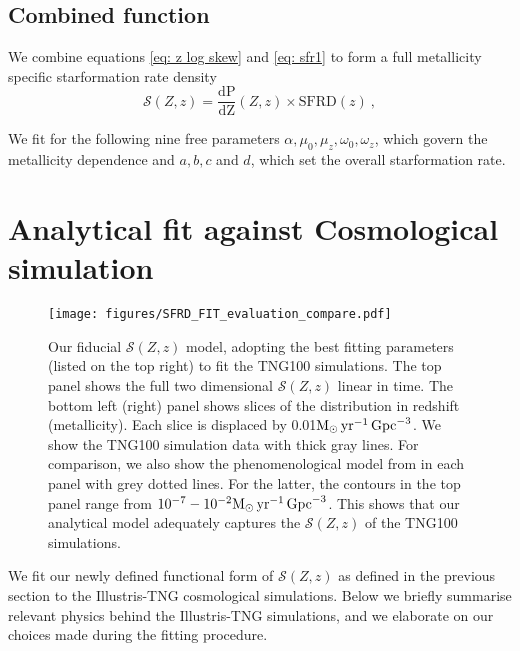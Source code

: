 \documentclass[twocolumn]{aastex631}
\newcommand{\Msun}{\ensuremath{\rm{M}_{\odot}}\xspace}
\newcommand{\yr}{\ensuremath{\,\rm{yr}}\xspace}
\newcommand{\Mpc}{\ensuremath{\,\rm{Gpc}}\xspace}
\newcommand{\SFRDzZ}{\ensuremath{\mathcal{S}(Z,z)}\xspace}
\newcommand{\SFRDz}{\ensuremath{\mathrm{SFRD}(z)}\xspace}
\newcommand{\dPdZ}{\ensuremath{\mathrm{\frac{dP}{dZ}}(Z,z)}\xspace}
\begin{document}
\subsection{Combined function}
We combine equations \ref{eq: z log skew} and \ref{eq: sfr1} to form a full metallicity specific starformation rate density 
\begin{equation}
\label{eq: total sfrd}
\boxed{
    \SFRDzZ = \dPdZ \times \SFRDz
    } \ , 
\end{equation}

\noindent We fit for the following nine free parameters $\alpha, \mu_0, \mu_z, \omega_0, \omega_z$, which govern the metallicity dependence and $a,b, c$ and $d$, which set the overall starformation rate.



\section{Analytical fit against Cosmological simulation \label{sec: fit against tng}}

\begin{figure*}
\centering
{}
\texttt{[image: figures/SFRD\_FIT\_evaluation\_compare.pdf]}
\caption{Our fiducial \SFRDzZ model, adopting the best fitting parameters (listed on the top right) to fit the TNG100 simulations.
The top panel shows the full two dimensional \SFRDzZ linear in time. The bottom left (right) panel shows slices of the distribution in redshift (metallicity). Each slice is displaced by 0.01$\Msun \yr^{-1}\Mpc^{-3}$. We show the TNG100 simulation data with thick gray lines. 
For comparison, we also show the phenomenological model from \protect\cite{Neijssel+2019} in each panel with grey dotted lines. For the latter, the contours in the top panel range from $10^{-7} - 10^{-2} \Msun \yr^{-1}\Mpc^{-3}$. This shows that our analytical model adequately captures the \SFRDzZ of the TNG100 simulations.
 \label{fig: fit SFRD}}
\end{figure*}
We fit our newly defined functional form of \SFRDzZ as defined in the previous section to the Illustris-TNG cosmological simulations. Below we briefly summarise relevant physics behind the Illustris-TNG simulations, and we elaborate on our choices made during the fitting procedure.
\end{document}
